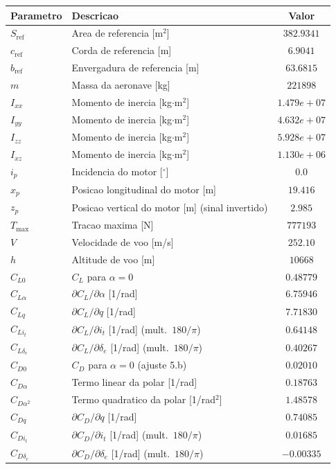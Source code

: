 \begin{tabular}{llc}
\toprule
Parametro & Descricao & Valor \\
\midrule
$S_{\mathrm{ref}}$ & Area de referencia [m$^2$] & $382.9341$ \\
$c_{\mathrm{ref}}$ & Corda de referencia [m] & $6.9041$ \\
$b_{\mathrm{ref}}$ & Envergadura de referencia [m] & $63.6815$ \\
$m$ & Massa da aeronave [kg] & $221898$ \\
$I_{xx}$ & Momento de inercia [kg$\cdot$m$^2$] & $1.479e+07$ \\
$I_{yy}$ & Momento de inercia [kg$\cdot$m$^2$] & $4.632e+07$ \\
$I_{zz}$ & Momento de inercia [kg$\cdot$m$^2$] & $5.928e+07$ \\
$I_{xz}$ & Momento de inercia [kg$\cdot$m$^2$] & $1.130e+06$ \\
$i_p$ & Incidencia do motor [$^\circ$] & $0.0$ \\
$x_p$ & Posicao longitudinal do motor [m] & $19.416$ \\
$z_p$ & Posicao vertical do motor [m] (sinal invertido) & $2.985$ \\
$T_{\max}$ & Tracao maxima [N] & $777193$ \\
$V$ & Velocidade de voo [m/s] & $252.10$ \\
$h$ & Altitude de voo [m] & $10668$ \\
$C_{L0}$ & $C_L$ para $\alpha=0$ & $0.48779$ \\
$C_{L\alpha}$ & $\partial C_L/\partial\alpha$ [1/rad] & $6.75946$ \\
$C_{Lq}$ & $\partial C_L/\partial q$ [1/rad] & $7.71830$ \\
$C_{Li_t}$ & $\partial C_L/\partial i_t$ [1/rad] (mult.\ $180/\pi$) & $0.64148$ \\
$C_{L\delta_e}$ & $\partial C_L/\partial\delta_e$ [1/rad] (mult.\ $180/\pi$) & $0.40267$ \\
$C_{D0}$ & $C_D$ para $\alpha=0$ (ajuste 5.b) & $0.02010$ \\
$C_{D\alpha}$ & Termo linear da polar [1/rad] & $0.18763$ \\
$C_{D\alpha^2}$ & Termo quadratico da polar [1/rad$^2$] & $1.48578$ \\
$C_{Dq}$ & $\partial C_D/\partial q$ [1/rad] & $0.74085$ \\
$C_{Di_t}$ & $\partial C_D/\partial i_t$ [1/rad] (mult.\ $180/\pi$) & $0.01685$ \\
$C_{D\delta_e}$ & $\partial C_D/\partial\delta_e$ [1/rad] (mult.\ $180/\pi$) & $-0.00335$ \\

\end{tabular}
